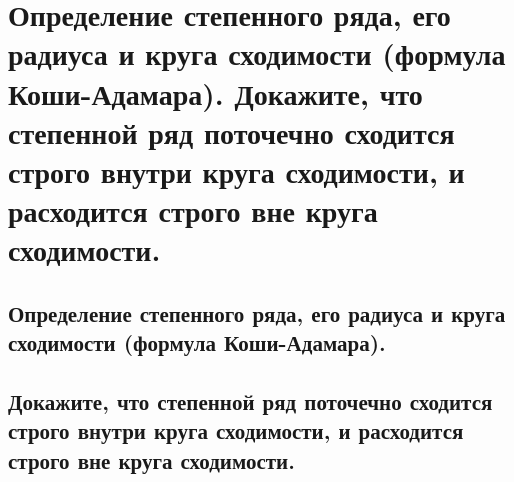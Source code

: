 \section{Определение степенного ряда, его радиуса и круга сходимости (формула Коши-Адамара). Докажите, что степенной ряд поточечно сходится строго внутри круга сходимости, и расходится строго вне круга сходимости.}

\subsection{Определение степенного ряда, его радиуса и круга сходимости (формула Коши-Адамара).}

\subsection{Докажите, что степенной ряд поточечно сходится строго внутри круга сходимости, и расходится строго вне круга сходимости.}